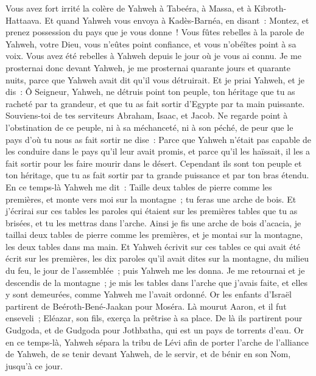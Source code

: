 \begin{multicols}{2}
Vous avez fort irrité la colère de Yahweh à Tabeéra, à Massa, et à Kibroth-Hattaava.
Et quand Yahweh vous envoya à Kadès-Barnéa, en disant~: Montez, et prenez possession du pays que je vous donne~! Vous fûtes rebelles à la parole de Yahweh, votre Dieu, vous n'eûtes point confiance, et vous n'obéîtes point à sa voix.
Vous avez été rebelles à Yahweh depuis le jour où je vous ai connu.
Je me prosternai donc devant Yahweh, je me prosternai quarante jours et quarante nuits, parce que Yahweh avait dit qu'il vous détruirait.
Et je priai Yahweh, et je dis~: Ô Seigneur, Yahweh, ne détruis point ton peuple, ton héritage que tu as racheté par ta grandeur, et que tu as fait sortir d'Egypte par ta main puissante.
Souviens-toi de tes serviteurs Abraham, Isaac, et Jacob. Ne regarde point à l'obstination de ce peuple, ni à sa méchanceté, ni à son péché,
de peur que le pays d'où tu nous as fait sortir ne dise~: Parce que Yahweh n'était pas capable de les conduire dans le pays qu'il leur avait promis, et parce qu'il les haïssait, il les a fait sortir pour les faire mourir dans le désert.
Cependant ils sont ton peuple et ton héritage, que tu as fait sortir par ta grande puissance et par ton bras étendu.
\VerseOne{}En ce temps-là Yahweh me dit~: Taille deux tables de pierre comme les premières, et monte vers moi sur la montagne~; tu feras une arche de bois.
Et j'écrirai sur ces tables les paroles qui étaient sur les premières tables que tu as brisées, et tu les mettras dans l'arche.
Ainsi je fis une arche de bois d'acacia, je taillai deux tables de pierre comme les premières, et je montai sur la montagne, les deux tables dans ma main.
Et Yahweh écrivit sur ces tables ce qui avait été écrit sur les premières, les dix paroles qu'il avait dites sur la montagne, du milieu du feu, le jour de l'assemblée~; puis Yahweh me les donna.
Je me retournai et je descendis de la montagne~; je mis les tables dans l'arche que j'avais faite, et elles y sont demeurées, comme Yahweh me l'avait ordonné.
Or les enfants d'Israël partirent de Beéroth-Bené-Jaakan pour Moséra. Là mourut Aaron, et il fut enseveli~; Eléazar, son fils, exerça la prêtrise à sa place.
De là ils partirent pour Gudgoda, et de Gudgoda pour Jothbatha, qui est un pays de torrents d'eau.
Or en ce temps-là, Yahweh sépara la tribu de Lévi afin de porter l'arche de l'alliance de Yahweh, de se tenir devant Yahweh, de le servir, et de bénir en son Nom, jusqu'à ce jour.

\end{multicols}

